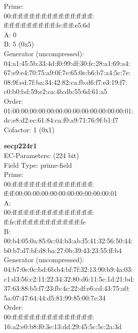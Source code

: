 Prime:\\
    00:ff:ff:ff:ff:ff:ff:ff:ff:ff:ff:ff:ff:ff:ff:\\
    ff:ff:ff:ff:ff:ff:ff:ff:ff:fe:ff:ff:e5:6d\\
A:    0\\
B:    5 (0x5)\\
Generator (uncompressed):\\
    04:a1:45:5b:33:4d:f0:99:df:30:fc:28:a1:69:a4:\\
    67:e9:e4:70:75:a9:0f:7e:65:0e:b6:b7:a4:5c:7e:\\
    08:9f:ed:7f:ba:34:42:82:ca:fb:d6:f7:e3:19:f7:\\
    c0:b0:bd:59:e2:ca:4b:db:55:6d:61:a5\\
Order: \\
    01:00:00:00:00:00:00:00:00:00:00:00:00:00:01:\\
    dc:e8:d2:ec:61:84:ca:f0:a9:71:76:9f:b1:f7\\
Cofactor:  1 (0x1)\\
\item \textbf{ secp224r1 }\\
EC-Parameters: (224 bit)\\
Field Type: prime-field\\
Prime:\\
    00:ff:ff:ff:ff:ff:ff:ff:ff:ff:ff:ff:ff:ff:ff:\\
    ff:ff:00:00:00:00:00:00:00:00:00:00:00:01\\
A:   \\
    00:ff:ff:ff:ff:ff:ff:ff:ff:ff:ff:ff:ff:ff:ff:\\
    ff:fe:ff:ff:ff:ff:ff:ff:ff:ff:ff:ff:ff:fe\\
B:   \\
    00:b4:05:0a:85:0c:04:b3:ab:f5:41:32:56:50:44:\\
    b0:b7:d7:bf:d8:ba:27:0b:39:43:23:55:ff:b4\\
Generator (uncompressed):\\
    04:b7:0e:0c:bd:6b:b4:bf:7f:32:13:90:b9:4a:03:\\
    c1:d3:56:c2:11:22:34:32:80:d6:11:5c:1d:21:bd:\\
    37:63:88:b5:f7:23:fb:4c:22:df:e6:cd:43:75:a0:\\
    5a:07:47:64:44:d5:81:99:85:00:7e:34\\
Order: \\
    00:ff:ff:ff:ff:ff:ff:ff:ff:ff:ff:ff:ff:ff:ff:\\
    16:a2:e0:b8:f0:3e:13:dd:29:45:5c:5c:2a:3d\\
